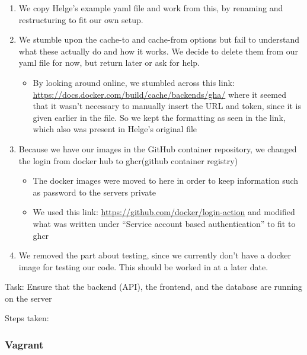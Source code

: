 \begin{enumerate}
    \item We copy Helge's example yaml file and work from this, by renaming and restructuring to fit our own setup.
    \item We stumble upon the cache-to and cache-from options but fail to understand what these actually do and how it works. We decide to delete them from our yaml file for now, but return later or ask for help.

    \begin{itemize}
        \item By looking around online, we stumbled across this link: \url{https://docs.docker.com/build/cache/backends/gha/} where it seemed that it wasn't necessary to manually insert the URL and token, since it is given earlier in the file. So we kept the formatting as seen in the link, which also was present in Helge's original file
    \end{itemize}
    \item Because we have our images in the GitHub container repository, we changed the login from docker hub to ghcr(github container registry)

    \begin{itemize}
        \item The docker images were moved to here in order to keep information such as password to the servers private
        \item We used this link: \url{https://github.com/docker/login-action} and modified what was written under ``Service account based authentication'' to fit to ghcr
    \end{itemize}
    \item We removed the part about testing, since we currently don't have a docker image for testing our code. This should be worked in at a later date.
\end{enumerate}

Task: Ensure that the backend (API), the frontend, and the database are
running on the server

Steps taken:

\subsubsection{Vagrant}
\label{log:vagrant}


